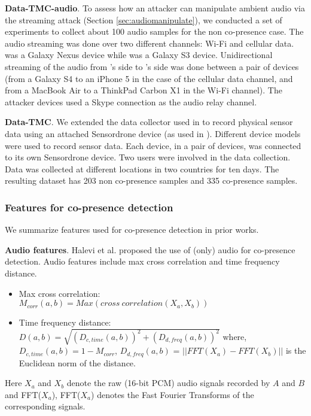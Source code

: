 {\textbf{Data-TMC-audio}. To assess how an attacker can manipulate ambient audio via the
streaming attack (Section \ref{sec:audiomanipulate}), we conducted a
set of experiments to collect about 100 audio samples for the non
co-presence case. The audio streaming was done over two different channels:
Wi-Fi and cellular data. \prover was a Galaxy Nexus device while
\verifier was a Galaxy S3 device. Unidirectional streaming of the audio from
\prover's side to \verifier's side was done between a pair of devices (from
a Galaxy S4 to an iPhone 5 in the case of the cellular data channel,
and from a MacBook Air to a ThinkPad Carbon X1 in the Wi-Fi
channel). The attacker devices used a Skype connection as the audio
relay channel.

\textbf{Data-TMC}. We extended the data collector used in \cite{TruongPerCom14} to record physical
sensor data using an attached Sensordrone device (as used in
\cite{ShresthaFC2014}). Different device models were used to record sensor
data. Each device, in a pair of devices, was connected to its own Sensordrone
device. Two users were involved in the data collection. Data was collected at
different locations in two countries for ten days. The resulting dataset has
203 non co-presence samples and 335 co-presence samples.






\subsubsection{Features for co-presence detection}
We summarize features used for co-presence detection in prior works.

\textbf{Audio features}. Halevi et al. \cite{DBLP:conf/esorics/HaleviMSX12} proposed the use of (only) audio
for co-presence detection. Audio features include max cross correlation and time frequency distance.

\begin{itemize}
\item Max cross correlation: \\ $ M_{corr}(a,b) = Max(cross\ correlation(X_a,X_b))$
\item Time frequency distance: \\ $D(a,b) = \sqrt{(D_{c,time}(a,b))^2 + (D_{d,freq}(a,b))^2}$
where, $D_{c,time}(a,b) = 1 - M_{corr}$, $D_{d,freq}(a,b)$ =
$||FFT(X_a) - FFT(X_b)||$ is the Euclidean norm of the distance.
\end{itemize}
Here $X_a$ and $X_b$ denote the raw (16-bit PCM) audio signals recorded by $A$ and $B$ and FFT($X_a$),
FFT($X_a$) denotes the Fast Fourier Transforms of the corresponding signals.

}
